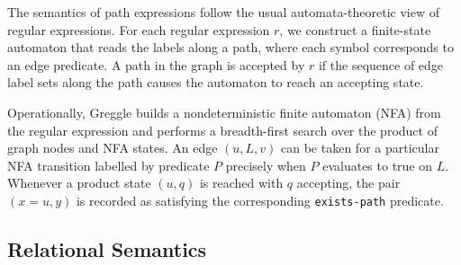 \documentclass[11pt]{article}
\begin{document}
The semantics of path expressions follow the usual automata-theoretic
view of regular expressions.  For each regular expression $r$, we
construct a finite-state automaton that reads the labels along a path,
where each symbol corresponds to an edge predicate.  A path in the
graph is accepted by $r$ if the sequence of edge label sets along the
path causes the automaton to reach an accepting state.

Operationally, Greggle builds a nondeterministic finite automaton
(NFA) from the regular expression and performs a breadth-first search
over the product of graph nodes and NFA states.  An edge
$(u,L,v)$ can be taken for a particular NFA transition labelled by
predicate $P$ precisely when $P$ evaluates to true on $L$.
Whenever a product state $(u,q)$ is reached with $q$ accepting, the
pair $(x=u,y)$ is recorded as satisfying the corresponding
\texttt{exists-path} predicate.

\subsection{Relational Semantics}
\end{document}
